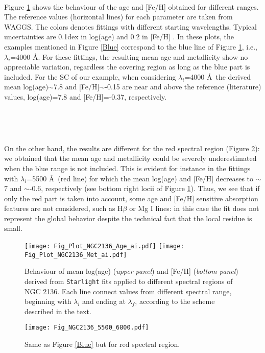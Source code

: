 \documentclass[baaa]{baaa}
\begin{document}
\

Figure \ref{Plots} shows the behaviour of the age and [Fe/H] obtained for different ranges. The reference values (horizontal lines) for each parameter are taken from WAGGS. The colors denotes fittings with different starting wavelengths. Typical uncertainties are 0.1dex in log(age) and 0.2 in [Fe/H] \citep{CR2010b}. In these plots, the examples mentioned in Figure \ref{Blue} correspond to the blue line of Figure \ref{Plots}, i.e., $\lambda_i$=4000 \AA. For these fittings, the resulting mean age and metallicity show no appreciable variation, regardless the covering region as long as the blue part is included. For the SC of our example, when considering $\lambda_i$=4000 \AA\ the derived mean log(age)$\sim$7.8 and [Fe/H]$\sim$-0.15 are near and above the reference (literature) values, log(age)=7.8 and [Fe/H]=-0.37, respectively.

\

\

On the other hand, the results are different for the red spectral region (Figure \ref{Red}): we  obtained that the mean age and metallicity could be severely underestimated when the blue range is not included. This is evident for instance in the fittings with $\lambda_i$=5500 \AA\ (red line) for which the mean log(age) and [Fe/H] decreases to $\sim$7 and $\sim$-0.6, respectively (see bottom right locii of Figure \ref{Plots}). Thus, we see that if only the red part is taken into account, some  age and [Fe/H] sensitive absorption features are not considered, such as H$\beta$ or Mg I lines: in this case the fit does not represent the global behavior despite the technical fact that the local residue is small.

\begin{figure}[!ht]
\centering
\texttt{[image: Fig\_Plot\_NGC2136\_Age\_ai.pdf]}
\texttt{[image: Fig\_Plot\_NGC2136\_Met\_ai.pdf]}
\caption{Behaviour of mean log(age) (\emph {upper panel}) and [Fe/H] (\emph {bottom panel}) derived from {\tt Starlight} fits applied to different spectral regions of NGC 2136. Each line connect values from different spectral range, beginning with $\lambda_{i}$ and ending at $\lambda_f$, according to the scheme described in the text.}
\label{Plots}
\end{figure}

\begin{figure}[!ht]
\centering
\texttt{[image: Fig\_NGC2136\_5500\_6800.pdf]}
\caption{Same as Figure \ref{Blue} but for red spectral region.}
\label{Red}
\end{figure}
\end{document}
